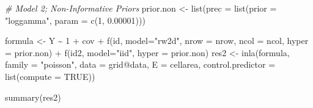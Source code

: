 \documentclass[
]{article}
\newenvironment{Shaded}{\begin{snugshade}}{\end{snugshade}}
\newcommand{\AttributeTok}[1]{\textcolor[rgb]{0.77,0.63,0.00}{#1}}
\newcommand{\CommentTok}[1]{\textcolor[rgb]{0.56,0.35,0.01}{\textit{#1}}}
\newcommand{\ConstantTok}[1]{\textcolor[rgb]{0.00,0.00,0.00}{#1}}
\newcommand{\DecValTok}[1]{\textcolor[rgb]{0.00,0.00,0.81}{#1}}
\newcommand{\FloatTok}[1]{\textcolor[rgb]{0.00,0.00,0.81}{#1}}
\newcommand{\FunctionTok}[1]{\textcolor[rgb]{0.00,0.00,0.00}{#1}}
\newcommand{\NormalTok}[1]{#1}
\newcommand{\OtherTok}[1]{\textcolor[rgb]{0.56,0.35,0.01}{#1}}
\newcommand{\SpecialCharTok}[1]{\textcolor[rgb]{0.00,0.00,0.00}{#1}}
\newcommand{\StringTok}[1]{\textcolor[rgb]{0.31,0.60,0.02}{#1}}
\begin{document}
\begin{Shaded}
\begin{Highlighting}[]
\CommentTok{\# Model 2; Non{-}Informative Priors}
\NormalTok{prior.non }\OtherTok{\textless{}{-}} \FunctionTok{list}\NormalTok{(}\AttributeTok{prec =} \FunctionTok{list}\NormalTok{(}\AttributeTok{prior =} \StringTok{"loggamma"}\NormalTok{,}
                               \AttributeTok{param =} \FunctionTok{c}\NormalTok{(}\DecValTok{1}\NormalTok{, }\FloatTok{0.00001}\NormalTok{)))}

\NormalTok{formula }\OtherTok{\textless{}{-}}\NormalTok{ Y }\SpecialCharTok{\textasciitilde{}} \DecValTok{1} \SpecialCharTok{+}\NormalTok{ cov }\SpecialCharTok{+}
  \FunctionTok{f}\NormalTok{(id, }\AttributeTok{model=}\StringTok{"rw2d"}\NormalTok{, }\AttributeTok{nrow =}\NormalTok{ nrow, }\AttributeTok{ncol =}\NormalTok{ ncol, }\AttributeTok{hyper =}\NormalTok{ prior.non) }\SpecialCharTok{+}
  \FunctionTok{f}\NormalTok{(id2, }\AttributeTok{model=}\StringTok{"iid"}\NormalTok{, }\AttributeTok{hyper =}\NormalTok{ prior.non)}
\NormalTok{res2 }\OtherTok{\textless{}{-}} \FunctionTok{inla}\NormalTok{(formula, }\AttributeTok{family =} \StringTok{"poisson"}\NormalTok{, }\AttributeTok{data =}\NormalTok{ grid}\SpecialCharTok{@}\NormalTok{data,}
    \AttributeTok{E =}\NormalTok{ cellarea, }\AttributeTok{control.predictor =} \FunctionTok{list}\NormalTok{(}\AttributeTok{compute =} \ConstantTok{TRUE}\NormalTok{))}

\FunctionTok{summary}\NormalTok{(res2)}
\end{Highlighting}
\end{Shaded}
\end{document}
